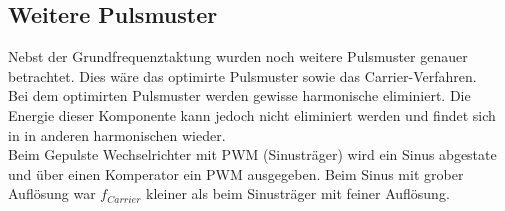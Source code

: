 \subsection{Weitere Pulsmuster}
Nebst der Grundfrequenztaktung wurden noch weitere Pulsmuster genauer betrachtet. Dies wäre das optimirte Pulsmuster sowie das Carrier-Verfahren.\\

Bei dem optimirten Pulsmuster werden gewisse harmonische eliminiert. Die Energie dieser Komponente kann jedoch nicht eliminiert werden und findet sich in in anderen harmonischen wieder.\\

Beim Gepulste Wechselrichter mit PWM (Sinusträger) wird ein Sinus abgestate und über einen Komperator ein PWM ausgegeben. Beim Sinus mit grober Auflösung war $f_{Carrier}$ kleiner als beim Sinusträger mit feiner Auflösung.


